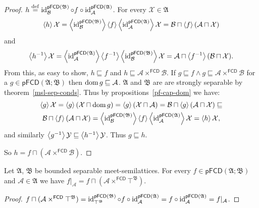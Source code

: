 \begin{proof}
$h\overset{\mathrm{def}}{=}\operatorname{id}_{\mathcal{B}}^{\mathsf{pFCD}(\mathfrak{B})}\circ f\circ\operatorname{id}_{\mathcal{A}}^{\mathsf{pFCD}(\mathfrak{A})}$.
For every $\mathcal{X}\in\mathfrak{A}$
\[
\left\langle h\right\rangle\mathcal{X}=\left\langle \operatorname{id}_{\mathcal{B}}^{\mathsf{pFCD}(\mathfrak{B})}\right\rangle\left\langle f\right\rangle\left\langle \operatorname{id}_{\mathcal{A}}^{\mathsf{pFCD}(\mathfrak{A})}\right\rangle\mathcal{X}=\mathcal{B}\sqcap\left\langle f\right\rangle(\mathcal{A}\sqcap\mathcal{X})
\]
and
\[
\left\langle h^{-1}\right\rangle\mathcal{X}=\left\langle \operatorname{id}_{\mathcal{A}}^{\mathsf{pFCD}(\mathfrak{A})}\right\rangle\left\langle f^{-1}\right\rangle\left\langle \operatorname{id}_{\mathcal{B}}^{\mathsf{pFCD}(\mathfrak{B})}\right\rangle\mathcal{X}=\mathcal{A}\sqcap\left\langle f^{-1}\right\rangle(\mathcal{B}\sqcap\mathcal{X}).
\]
From this, as easy to show, $h\sqsubseteq f$ and $h\sqsubseteq\mathcal{A}\times^{\mathsf{FCD}}\mathcal{B}$.
If $g\sqsubseteq f\wedge g\sqsubseteq\mathcal{A}\times^{\mathsf{FCD}}\mathcal{B}$
for a $g\in\mathsf{pFCD}(\mathfrak{A};\mathfrak{B})$ then $\operatorname{dom} g\sqsubseteq\mathcal{A}$.
$\mathfrak{A}$ and $\mathfrak{B}$ are are strongly separable by theorem~\ref{msl-sep-conds}. Thus
by propositions~\ref{pf-cap-dom} we have:
\begin{multline*}
\left\langle g\right\rangle\mathcal{X}=\left\langle g\right\rangle(\mathcal{X}\sqcap\operatorname{dom} g)=\left\langle g\right\rangle(\mathcal{X}\sqcap\mathcal{A})=
\mathcal{B}\sqcap\left\langle g\right\rangle(\mathcal{A}\sqcap\mathcal{X})\sqsubseteq \\
\mathcal{B}\sqcap\left\langle f\right\rangle(\mathcal{A}\sqcap\mathcal{X})=\left\langle \operatorname{id}_{\mathcal{B}}^{\mathsf{pFCD}(\mathfrak{B})}\right\rangle\left\langle f\right\rangle\left\langle \operatorname{id}_{\mathcal{A}}^{\mathsf{pFCD}(\mathfrak{A})}\right\rangle\mathcal{X}=\left\langle h\right\rangle\mathcal{X},
\end{multline*}
and similarly $\left\langle g^{-1}\right\rangle\mathcal{Y}\sqsubseteq\left\langle h^{-1}\right\rangle\mathcal{Y}$.
Thus $g\sqsubseteq h$.

So $h=f\sqcap(\mathcal{A}\times^{\mathsf{FCD}}\mathcal{B})$.\end{proof}
\begin{cor}
Let $\mathfrak{A}$, $\mathfrak{B}$ be bounded separable
meet-semilattices. For every $f\in\mathsf{pFCD}(\mathfrak{A};\mathfrak{B})$
and $\mathcal{A}\in\mathfrak{A}$ we have $f|_{\mathcal{A}}=f\sqcap(\mathcal{A}\times^{\mathsf{FCD}}\top^{\mathfrak{B}})$.\end{cor}
\begin{proof}
$\text{\ensuremath{f\sqcap(\mathcal{A}\times^{\mathsf{FCD}}\top^{\mathfrak{B}})}}=\operatorname{id}_{\top^{\mathfrak{B}}}^{\mathsf{pFCD}(\mathfrak{B})}\circ f\circ\operatorname{id}_{\mathcal{A}}^{\mathsf{pFCD}(\mathfrak{A})}=f\circ\operatorname{id}_{\mathcal{A}}^{\mathsf{pFCD}(\mathfrak{A})}=f|_{\mathcal{A}}$.\end{proof}
